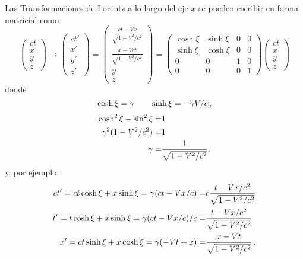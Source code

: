 \begin{frame}
Las Transformaciones de Lorentz  a lo largo del eje $x$ se pueden escribir en forma matricial como
\begin{equation}
\label{eq:147qft}
  \begin{pmatrix}
    ct\\
    x\\
    y\\
    z
  \end{pmatrix}\to
  \begin{pmatrix}
    ct'\\
    x'\\
    y'\\
    z'
  \end{pmatrix}=
  \begin{pmatrix}
    \frac{ct-Vx}{\sqrt{1-V^2/c^2}}\\
    \frac{x-Vct}{\sqrt{1-V^2/c^2}}\\
    y\\
    z
  \end{pmatrix}=
  \begin{pmatrix}
    \cosh\xi&\sinh\xi&0&0\\
    \sinh\xi&\cosh\xi&0&0\\
    0     &  0  &1&0\\
    0     &  0  &0&1
  \end{pmatrix}
  \begin{pmatrix}
    ct\\
    x\\
    y\\
    z
  \end{pmatrix}
\end{equation}
donde
\begin{equation}
  \cosh\xi=\gamma\qquad\sinh\xi=-\gamma V/c\,,
\end{equation}
\begin{align*}
\cosh^2\xi-\sin^2\xi=&1\nonumber\\
\gamma^2(1-V^2/c^2)=&1\nonumber\\
 \gamma=&\frac{1}{\sqrt{1-V^2/c^2}}.
\end{align*}
y, por ejemplo:
\begin{align}
ct'=  ct\cosh{\xi}+x\sinh\xi=\gamma(ct-V x/c)=&c\frac{t-V x/c^2}{\sqrt{1-V^2/c^2}}\nonumber\\
t'=  t\cosh{\xi}+x\sinh\xi=\gamma(ct-V x/c)/c=&\frac{t-V x/c^2}{\sqrt{1-V^2/c^2}}\nonumber\\
x'=  ct\sinh{\xi}+x\cosh\xi=\gamma(-Vt+ x)=&\frac{x-Vt}{\sqrt{1-V^2/c^2}}\,.
\end{align}

\end{frame}
